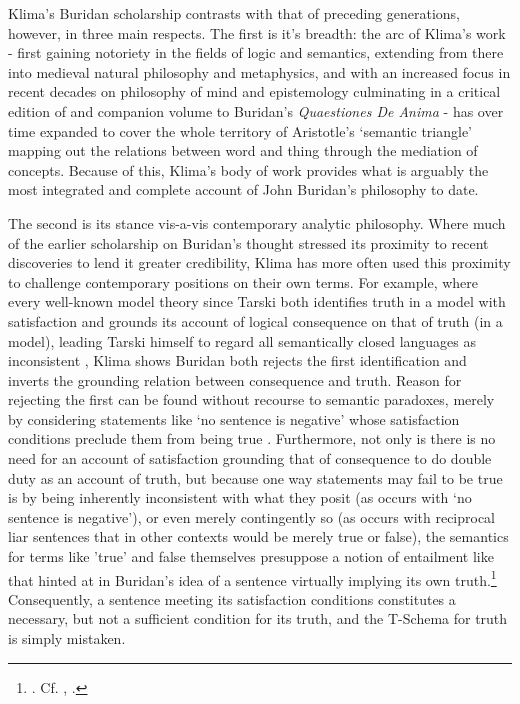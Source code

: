 \documentclass[]{article}
\begin{document}
Klima's Buridan scholarship contrasts with that of preceding generations, 
however, 
in three main respects. 
The first is it's breadth: 
the arc of Klima's work - 
first gaining notoriety in the fields of logic and semantics, 
extending from there into medieval natural philosophy and metaphysics, 
and with an increased focus in recent decades on philosophy of mind and epistemology 
culminating in a critical edition of and companion volume to Buridan's \emph{Quaestiones De Anima}  -  
has over time expanded to cover the whole territory of Aristotle's `semantic triangle'  
mapping out the relations between word and thing through the mediation of concepts. 
Because of this, Klima's body of work provides what is arguably the most integrated and complete account of John Buridan's philosophy to date.

The second is its stance vis-a-vis contemporary analytic philosophy. 
Where much of the earlier scholarship on Buridan's thought
stressed its proximity to recent discoveries 
to lend it greater credibility, 
Klima has more often used this proximity 
to challenge contemporary positions on their own terms. 
For example, 
where every well-known model theory since Tarski 
both 
identifies truth in a model with satisfaction 
and 
grounds its account of logical consequence on that of truth (in a model), 
leading Tarski himself to regard all semantically closed languages 
as inconsistent \autocite[348-349]{Tarski1943}, 
Klima shows Buridan 
both
rejects the first identification 
and 
inverts the grounding relation between consequence and truth. 
Reason for rejecting the first can be found without recourse to semantic paradoxes, 
merely by considering statements like `no sentence is negative' 
whose satisfaction conditions preclude them from being true \autocite[96-100]{Klima2004}. 
Furthermore, 
not only is there is no need for an account of satisfaction grounding that of consequence to do double duty as an account of truth, 
but because one way statements may fail to be true 
is by being inherently inconsistent with what they posit 
(as occurs with `no sentence is negative'), 
or even merely contingently so 
(as occurs with reciprocal liar sentences that in other contexts would be merely true or false), 
the semantics for terms like 'true' and false themselves presuppose a notion of entailment like that hinted at in Buridan's idea of a sentence virtually implying its own truth.\footnote{\autocite[101-107]{Klima2004}. Cf. \autocite[221-225]{Klima2009}, \autocite[22-27]{Hughes1982}.} 
Consequently, 
a sentence meeting its satisfaction conditions constitutes a necessary, 
but not a sufficient 
condition for its truth, 
and the T-Schema for truth is simply mistaken. 
\end{document}
